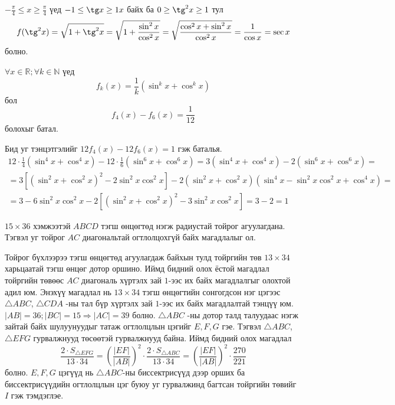 \documentclass[10pt,a4paper,oneside]{book}
\begin{document}
$-\frac{\pi}{4}\leq x\geq\frac{\pi}{4}$ үед $-1\leq\tg x\geq1 x$ байх ба $0\geq \tg^2 x \geq 1$ тул
\begin{equation*}
f(\tg^2 x) = \sqrt{1+\tg^2 x}=\sqrt{1+\frac{\sin^2 x}{\cos^2 x}}=\sqrt{\frac{\cos^2 x + \sin^2 x}{\cos^2 x}} = \frac{1}{\cos x}= \sec x
\end{equation*}
болно.

\Problem
$\forall x \in \mathbb{R}; \forall k \in \mathbb{N}$ үед
\begin{equation*}
f_k(x) = \frac{1}{k}\left(\sin^k x + \cos^k x\right)
\end{equation*}
бол
\begin{equation*}
f_4(x)-f_6(x) = \frac{1}{12}
\end{equation*}
болохыг батал.

\TheSolution
Бид уг тэнцэтгэлийг $12f_4(x) - 12f_6(x)=1$ гэж баталья.
\begin{equation*}
\begin{split}
12\cdot\frac{1}{4}\left(\sin^4 x+\cos^4 x\right)-12\cdot\frac{1}{6}\left(\sin^6 x + \cos^6 x \right)=3\left(\sin^4 x + \cos^4 x\right) - 2\left(\sin^6 x + \cos^6 x\right) =\\
= 3\left[\left(\sin^2 x + \cos^2 x\right)^2 - 2\sin^2 x \cos^2 x\right] - 2\left(\sin^2 x + \cos^2 x\right)\left(\sin^4 x - \sin^2 x\cos^2 x + \cos^4 x\right) =\\
= 3-6\sin^2 x\cos^2 x - 2\left[\left(\sin^2 x + \cos^2 x\right)^2 - 3\sin^2 x\cos^2 x\right] = 3 - 2 = 1
\end{split}
\end{equation*}

 $15\times 36$ хэмжээтэй $ABCD$ тэгш өнцөгтөд нэгж радиустай тойрог агуулагдана. Тэгвэл уг тойрог $AC$ диагональтай огтлолцохгүй байх магадлалыг ол.

\Note
Тойрог бүхлээрээ тэгш өнцөгтөд агуулагдаж байхын тулд тойргийн төв $13\times 34$ харьцаатай тэгш өнцөг дотор оршино. Иймд бидний олох ёстой магадлал тойргийн төвөөс $AC$ диагональ хүртэлх зай $1$-ээс их байх магадлалгыг олохтой адил юм. Энэхүү магадлал нь $13\times 34$ тэгш өнцөгтийн сонгогдсон нэг цэгээс $\triangle ABC$, $\triangle CDA$ -ны тал бүр хүртэлх зай $1$-ээс их байх магадлалтай тэнцүү юм. $|AB| = 36; |BC| = 15 \Rightarrow |AC| = 39$ болно. $\triangle ABC$ -ны дотор талд талуудаас нэгж зайтай байх шулуунуудыг татаж огтлолцлын цэгийг $E, F, G$ гэе. Тэгвэл $\triangle ABC$, $\triangle EFG$ гурвалжнууд төсөөтэй гурвалжнууд байна. Иймд бидний олох магадлал
\begin{equation*}
\frac{2\cdot S_{\triangle EFG}}{13 \cdot 34} = \left(\frac{|EF|}{|AB|}\right)^2\cdot \frac{2\cdot S_{\triangle ABC}}{13\cdot 34} = 
\left(\frac{|EF|}{|AB|}\right)^2\cdot \frac{270}{221}
\end{equation*}
болно. $E, F, G$ цэгүүд нь $\triangle ABC$-ны биссектрисүүд дээр орших ба биссектрисүүдийн огтлолцлын цэг буюу уг гурвалжинд багтсан тойргийн төвийг $I$ гэж тэмдэглэе.
\end{document}
